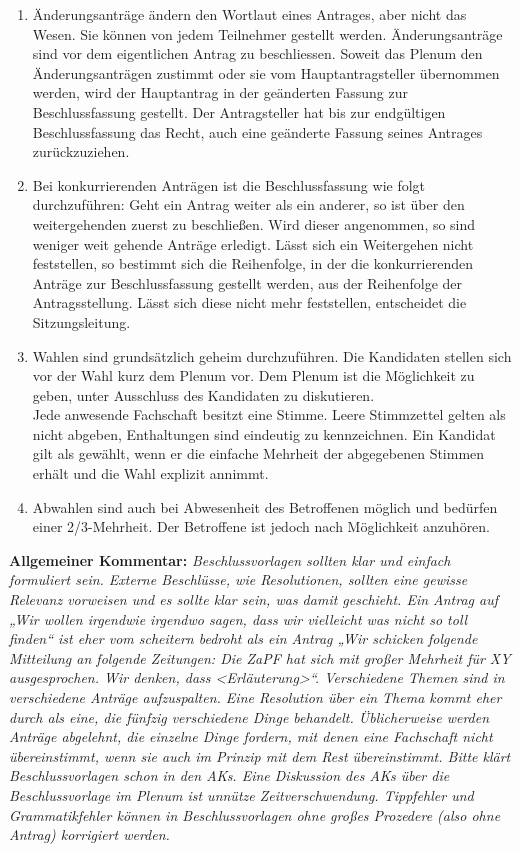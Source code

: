 \begin{enumerate}
\item{Änderungsanträge ändern den Wortlaut eines Antrages, aber nicht das Wesen. Sie können von jedem
Teilnehmer gestellt werden. Änderungsanträge sind vor dem eigentlichen Antrag zu beschliessen.
Soweit das Plenum den Änderungsanträgen zustimmt oder sie vom Hauptantragsteller übernommen
werden, wird der Hauptantrag in der geänderten Fassung zur Beschlussfassung gestellt. Der
Antragsteller hat bis zur endgültigen Beschlussfassung das Recht, auch eine geänderte Fassung
seines Antrages zurückzuziehen.}

\item{Bei konkurrierenden Anträgen ist die Beschlussfassung wie folgt durchzuführen:
Geht ein Antrag weiter als ein anderer, so ist über den weitergehenden zuerst zu beschließen. Wird
dieser angenommen, so sind weniger weit gehende Anträge erledigt. Lässt sich ein Weitergehen
nicht feststellen, so bestimmt sich die Reihenfolge, in der die konkurrierenden Anträge zur
Beschlussfassung gestellt werden, aus der Reihenfolge der Antragsstellung. Lässt sich diese nicht
mehr feststellen, entscheidet die Sitzungsleitung.}

\item{Wahlen sind grundsätzlich geheim durchzuführen. Die Kandidaten stellen sich vor der Wahl kurz
dem Plenum vor. Dem Plenum ist die Möglichkeit zu geben, unter Ausschluss des Kandidaten zu
diskutieren.\\
Jede anwesende Fachschaft besitzt eine Stimme. Leere Stimmzettel gelten als nicht abgeben,
Enthaltungen sind eindeutig zu kennzeichnen. Ein Kandidat gilt als gewählt, wenn er die einfache
Mehrheit der abgegebenen Stimmen erhält und die Wahl explizit annimmt.}

\item{Abwahlen sind auch bei Abwesenheit des Betroffenen möglich und bedürfen einer 2/3-Mehrheit.
Der Betroffene ist jedoch nach Möglichkeit anzuhören.}
\end{enumerate}

\textbf{Allgemeiner Kommentar:}
{\footnotesize\textit{
Beschlussvorlagen sollten klar und einfach formuliert sein. Externe Beschlüsse, wie Resolutionen,
sollten eine gewisse Relevanz vorweisen und es sollte klar sein, was damit geschieht. Ein Antrag
auf „Wir wollen irgendwie irgendwo sagen, dass wir vielleicht was nicht so toll finden“ ist eher vom
scheitern bedroht als ein Antrag „Wir schicken folgende Mitteilung an folgende Zeitungen: Die
ZaPF hat sich mit großer Mehrheit für XY ausgesprochen. Wir denken, dass <Erläuterung>“.
Verschiedene Themen sind in verschiedene Anträge aufzuspalten. Eine Resolution über ein Thema
kommt eher durch als eine, die fünfzig verschiedene Dinge behandelt. Üblicherweise werden
Anträge abgelehnt, die einzelne Dinge fordern, mit denen eine Fachschaft nicht übereinstimmt,
wenn sie auch im Prinzip mit dem Rest übereinstimmt.
Bitte klärt Beschlussvorlagen schon in den AKs. Eine Diskussion des AKs über die Beschlussvorlage
im Plenum ist unnütze Zeitverschwendung.
Tippfehler und Grammatikfehler können in Beschlussvorlagen ohne großes Prozedere (also ohne
Antrag) korrigiert werden.}}\\[4ex]



